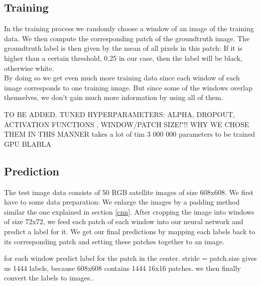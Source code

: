 \documentclass[10pt,conference,compsocconf]{IEEEtran}
\begin{document}
\subsection{Training}

In the training process we randomly choose a window of an image of the training data. We then compute the corresponding patch of the groundtruth image. The groundtruth label is then given by the mean of all pixels in this patch: If it is higher than a certain threshold, 0.25 in our case, then the label will be black, otherwise white.\\
By doing so we get even much more training data since each window of each image corresponds to one training image. But since some of the windows overlap themselves, we don't gain much more information by using all of them.


TO BE ADDED. TUNED HYPERPARAMETERS: ALPHA, DROPOUT, ACTIVATION FUNCTIONS , WINDOW/PATCH SIZE!"!! WHY WE CHOSE THEM IN THIS MANNER
takes a lot of tim 3 000 000 parameters to be trained
GPU BLABLA




\subsection{Prediction}

The test image data consists of 50 RGB satellite images of size 608x608. We first have to some data preparation: We enlarge the images by a padding method similar the one explained in section \ref{cnn}. After cropping the image into windows of size 72x72, we feed each patch of each window into our neural network and predict a label for it. We get our final predictions by mapping each labels back to its corresponding patch and setting these patches together to an image.


for each window predict label for the patch in the center. stride = patch.size
gives us 1444 labels, because 608x608 contains 1444 16x16 patches. we then finally convert the labels to images..
\end{document}
